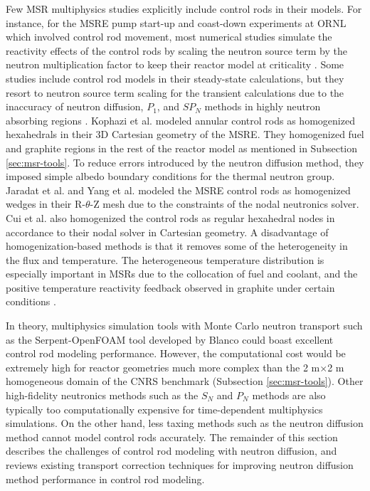 Few \gls{MSR} multiphysics studies explicitly include control rods in their models. For instance,
for the \gls{MSRE} pump start-up and coast-down experiments at \gls{ORNL} which involved control
rod movement, most numerical studies simulate the reactivity effects of the control rods by scaling
the neutron source term by the neutron multiplication factor to keep their reactor model at
criticality \cite{delpech_benchmark_2003, krepel_dyn3d-msr_2007}. Some studies include control rod
models in their steady-state calculations, but they resort to neutron source term scaling for the
transient calculations due to the inaccuracy of neutron diffusion, $P_1$, and $SP_N$ methods in
highly neutron absorbing regions \cite{kophazi_development_2009, jaradat_development_2021,
yang_development_2022}. Kophazi et al. \cite{kophazi_development_2009} modeled annular control rods
as homogenized hexahedrals in their 3D Cartesian geometry of the \gls{MSRE}. They
homogenized fuel and graphite regions in the rest of the reactor model as mentioned in Subsection
\ref{sec:msr-tools}. To reduce errors introduced by the neutron diffusion method, they imposed
simple albedo boundary conditions for the thermal neutron group. Jaradat et al.
\cite{jaradat_development_2021} and Yang et al. \cite{yang_development_2022} modeled the \gls{MSRE}
control rods as homogenized wedges in their R-$\theta$-Z mesh due to the constraints of the nodal
neutronics solver. Cui et al. \cite{cui_development_2021} also homogenized the control rods as
regular hexahedral nodes in accordance to their nodal solver in Cartesian geometry. A disadvantage
of homogenization-based methods is that it removes some of the heterogeneity in the flux and
temperature. The heterogeneous temperature distribution is especially important in \glspl{MSR} due
to the collocation of fuel and coolant, and the positive temperature reactivity feedback observed
in graphite under certain conditions \cite{mathieu_thorium_2006}.

In theory, multiphysics simulation tools with Monte Carlo neutron transport such as the
Serpent-OpenFOAM tool developed by Blanco \cite{blanco_neutronic_2020} could boast excellent
control rod modeling performance. However, the computational cost would be extremely high for
reactor geometries much more complex than the 2 m$\times$2 m homogeneous domain of the CNRS
benchmark (Subsection \ref{sec:msr-tools}). Other high-fidelity neutronics methods such as the
$S_N$ and $P_N$ methods are also typically too computationally expensive for time-dependent
multiphysics simulations. On the other hand, less taxing methods such as the neutron diffusion
method cannot model control rods accurately. The remainder of this section describes the challenges
of control rod modeling with neutron diffusion, and reviews existing transport correction
techniques for improving neutron diffusion method performance in control rod modeling.

